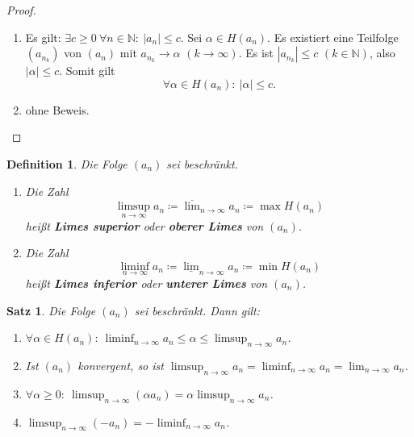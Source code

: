 \documentclass[12pt]{extreport} %
\newcommand{\N}{\mathbb{N}}
\theoremstyle{named}
\theoremstyle{itshape}
\newtheorem{satz}[unnamedtheorem]{Satz}
\newtheorem*{definition}{Definition}
\theoremstyle{normal}
\begin{document}
\begin{proof}\
	\begin{enumerate}
		\item Es gilt: $\exists c \geq 0 ~ \forall n \in \N: ~ |a_{n}| \leq c$. Sei $\alpha \in H(a_{n})$. Es existiert eine Teilfolge $(a_{n_{k}})$ von $(a_n)$
		        mit $a_{n_{k}} \rightarrow \alpha$ $(k \rightarrow \infty)$. Es ist $|a_{n_{k}}| \leq c$ $(k \in \N)$, also $|\alpha| \leq c$. Somit gilt
		        $$
		        \forall \alpha \in H(a_{n}): ~ |\alpha| \leq c.
		        $$
		\item ohne Beweis.
	\end{enumerate}
\end{proof}


   
\begin{definition} 
	Die Folge $(a_{n})$ sei beschränkt. 
	\begin{enumerate}
		\item Die Zahl
		$$
		\limsup_{n \rightarrow \infty} a_{n} \coloneqq \overline{\lim}_{n \rightarrow \infty} a_{n} \coloneqq \max H(a_{n})
		$$
	        hei{\ss}t \textbf{Limes superior} oder \textbf{oberer Limes} von $(a_{n})$.
		\item Die Zahl 
		$$
		\liminf_{n \rightarrow \infty} a_{n} \coloneqq \underline{\lim}_{n \rightarrow \infty} a_{n} \coloneqq \min H(a_{n})
		$$
		hei{\ss}t \textbf{Limes inferior} oder \textbf{unterer Limes} von $(a_{n})$.
	\end{enumerate}
\end{definition}


\begin{satz} \label{2.14:satz}
	Die Folge $(a_{n})$ sei beschränkt. Dann gilt:
	\begin{enumerate}
		\item $\forall \alpha \in H(a_{n}): ~ \liminf_{n \rightarrow \infty} a_{n} \leq \alpha \leq \limsup_{n \rightarrow \infty} a_{n}$.
		\item Ist $(a_{n})$ konvergent, so ist $\limsup_{n \rightarrow \infty} a_{n} = \liminf_{n \rightarrow \infty} a_{n} = \lim_{n \rightarrow \infty} a_{n}$.
		\item $\forall \alpha \geq 0: ~ \limsup_{n \rightarrow \infty}(\alpha a_{n}) = \alpha \limsup_{n \rightarrow \infty} a_{n}$.
		\item $\limsup_{n \rightarrow \infty} (-a_{n}) = - \liminf_{n \rightarrow \infty} a_{n}$.
	\end{enumerate}
\end{satz}
\end{document}

